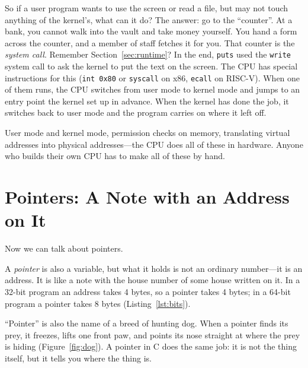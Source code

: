 So if a user program wants to use the screen or read a file, but may not touch anything of the kernel's, what can it do? The answer: go to the ``counter''. At a bank, you cannot walk into the vault and take money yourself. You hand a form across the counter, and a member of staff fetches it for you. That counter is the \emph{system call}. Remember Section~\ref{sec:runtime}? In the end, \texttt{puts} used the \texttt{write} system call to ask the kernel to put the text on the screen. The CPU has special instructions for this (\texttt{int 0x80} or \texttt{syscall} on x86, \texttt{ecall} on RISC-V). When one of them runs, the CPU switches from user mode to kernel mode and jumps to an entry point the kernel set up in advance. When the kernel has done the job, it switches back to user mode and the program carries on where it left off.

User mode and kernel mode, permission checks on memory, translating virtual addresses into physical addresses---the CPU does all of these in hardware. Anyone who builds their own CPU has to make all of these by hand.

\section{Pointers: A Note with an Address on It}
\label{sec:pointer}

Now we can talk about pointers.

A \emph{pointer} is also a variable, but what it holds is not an ordinary number---it is an address. It is like a note with the house number of some house written on it. In a 32-bit program an address takes 4 bytes, so a pointer takes 4 bytes; in a 64-bit program a pointer takes 8 bytes (Listing~\ref{lst:bits}).

``Pointer'' is also the name of a breed of hunting dog. When a pointer finds its prey, it freezes, lifts one front paw, and points its nose straight at where the prey is hiding (Figure~\ref{fig:dog}). A pointer in C does the same job: it is not the thing itself, but it tells you where the thing is.

